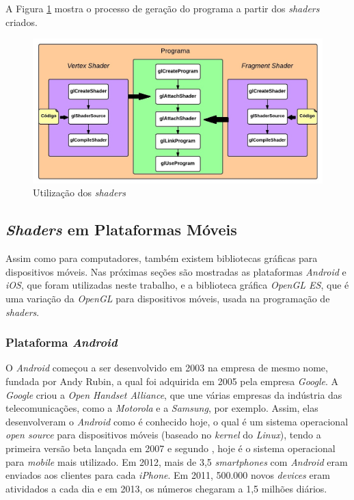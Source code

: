 	A Figura \ref{shader_use} mostra o processo de geração do programa a partir dos \textit{shaders} criados.

	\begin{figure}[ht]
	\centering
		\includegraphics[keepaspectratio=true,scale=0.4]{figuras/shader_use.jpg}
	\caption{Utilização dos \textit{shaders}}
	\label{shader_use}
	\end{figure}


\subsection{\textit{Shaders} em Plataformas Móveis}

	Assim como para computadores, também existem bibliotecas gráficas para dispositivos móveis. Nas próximas seções são mostradas as plataformas \textit{Android} e \textit{iOS}, que foram utilizadas neste trabalho, e a biblioteca gráfica \textit{OpenGL ES}, que é uma variação da \textit{OpenGL} para dispositivos móveis, usada na programação de \textit{shaders}.

	\subsubsection{Plataforma \textit{Android}}

	O \textit{Android} começou a ser desenvolvido em 2003 na empresa de mesmo nome, fundada por Andy Rubin, a qual foi adquirida em 2005 pela empresa \textit{Google}. A \textit{Google} criou a \textit{Open Handset Alliance}, que une várias empresas da indústria das telecomunicações, como a \textit{Motorola} e a \textit{Samsung}, por exemplo. Assim, elas desenvolveram o \textit{Android} como é conhecido hoje, o qual é um sistema operacional  \textit{open source} para dispositivos móveis (baseado no \textit{kernel} do \textit{Linux}), tendo a primeira versão beta lançada em 2007 e segundo \cite{android2013}, hoje é o sistema operacional para \textit{mobile} mais utilizado. Em 2012, mais de 3,5 \textit{smartphones} com \textit{Android} eram enviados aos clientes para cada \textit{iPhone}. Em 2011, 500.000 novos \textit{devices} eram atividados a cada dia e em 2013, os números chegaram a 1,5 milhões diários. 

